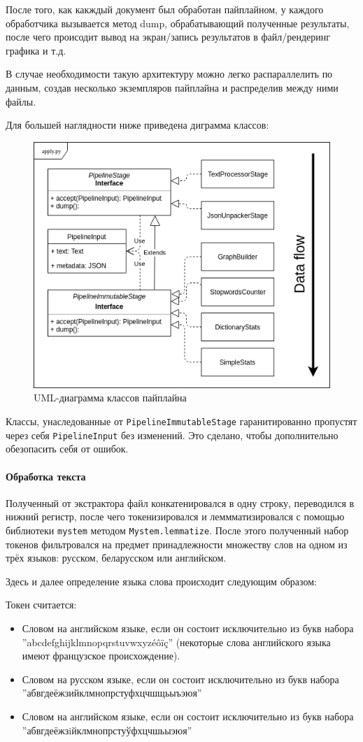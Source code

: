 После того, как какждый документ был обработан пайплайном, у каждого обработчика вызывается метод dump, обрабатывающий полученные результаты, после чего происодит вывод на экран/запись результатов в файл/рендеринг графика и т.д. 

В случае необходимости такую архитектуру можно легко распараллелить по данным, создав несколько экземпляров пайплайна и распределив между ними файлы. 

Для большей наглядности ниже приведена диграмма классов: 

\begin{figure}
	\includegraphics[width=.5\textwidth]{apply_uml_data_flow.png}
	\caption{UML-диаграмма классов пайплайна}
	\label{apply-uml}
\end{figure}

Классы, унаследованные от \texttt{PipelineImmutableStage} гаранитированно пропустят через себя \texttt{PipelineInput} без изменений. Это сделано, чтобы дополнительно обезопасить себя от ошибок.


\paragraph{Обработка текста}

Полученный от экстрактора файл конкатенировался в одну строку, переводился в нижний регистр, после чего токенизировался и леммматизировался с помощью библиотеки \texttt{mystem} методом \texttt{Mystem.lemmatize}. После этого полученный набор токенов фильтровался на предмет принадлежности множеству слов на одном из трёх языков: русском, беларусском или английском. 

Здесь и далее определение языка слова происходит следующим образом:

Токен считается:
\begin{itemize}
	\item Словом на английском языке, если он состоит исключительно из букв набора ''abcdefghijklmnopqrstuvwxyzéôïç'' (некоторые слова английского языка имеют французское происхождение).
	
	\item Словом на русском языке, если он состоит исключительно из букв набора ''абвгдеёжзийклмнопрстуфхцчшщьыъэюя''
	
	\item Словом на английском языке, если он состоит исключительно из букв набора ''абвгдеёжзiйклмнопрстуўфхцчшьыэюя''
\end{itemize}

